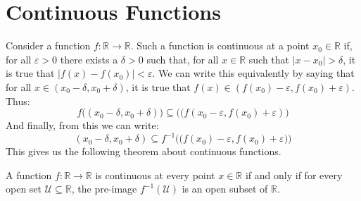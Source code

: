     \section{Continuous Functions}
        Consider a function $f:\mathbb{R}\rightarrow\mathbb{R}$.
        Such a function is continuous at a point
        $x_{0}\in\mathbb{R}$ if, for all $\varepsilon>0$ there exists
        a $\delta>0$ such that, for all $x\in\mathbb{R}$ such that
        $|x-x_{0}|>\delta$, it is true that
        $|f(x)-f(x_{0})|<\varepsilon$. We can write this
        equivalently by saying that for all
        $x\in(x_{0}-\delta,x_{0}+\delta)$, it is true that
        $f(x)\in(f(x_{0})-\varepsilon,f(x_{0})+\varepsilon)$.
        Thus:
        \begin{equation}
            f\Big((x_{0}-\delta,x_{0}+\delta)\Big)\subseteq
            \Big((f(x_{0}-\varepsilon,f(x_{0})+\varepsilon)\Big)
        \end{equation}
        And finally, from this we can write:
        \begin{equation}
            (x_{0}-\delta,x_{0}+\delta)\subseteq
            f^{-1}\Big(
                \big(f(x_{0})-\varepsilon,f(x_{0})+\varepsilon\big)
            \Big)
        \end{equation}
        This gives us the following theorem about
        continuous functions.
        \begin{theorem}
            A function $f:\mathbb{R}\rightarrow\mathbb{R}$ is
            continuous at every point $x\in\mathbb{R}$ if and only
            if for every open set $\mathcal{U}\subseteq\mathbb{R}$,
            the pre-image $f^{-1}(\mathcal{U})$ is an open subset
            of $\mathbb{R}$.
        \end{theorem}

